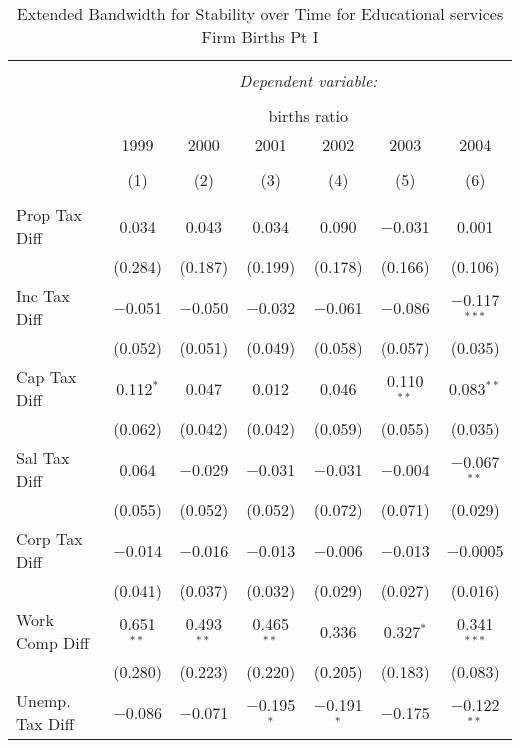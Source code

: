 
\begin{table}[!htbp] \centering 
  \caption{Extended Bandwidth for Stability over Time for  Educational services Firm Births Pt I} 
  \label{61year_eb} 
\small 
\begin{tabular}{@{\extracolsep{5pt}}lcccccc} 
\\[-1.8ex]\hline 
\hline \\[-1.8ex] 
 & \multicolumn{6}{c}{\textit{Dependent variable:}} \\ 
\cline{2-7} 
\\[-1.8ex] & \multicolumn{6}{c}{births ratio} \\ 
 & 1999 & 2000 & 2001 & 2002 & 2003 & 2004 \\ 
\\[-1.8ex] & (1) & (2) & (3) & (4) & (5) & (6)\\ 
\hline \\[-1.8ex] 
 Prop Tax Diff & 0.034 & 0.043 & 0.034 & 0.090 & $-$0.031 & 0.001 \\ 
  & (0.284) & (0.187) & (0.199) & (0.178) & (0.166) & (0.106) \\ 
  Inc Tax Diff & $-$0.051 & $-$0.050 & $-$0.032 & $-$0.061 & $-$0.086 & $-$0.117$^{***}$ \\ 
  & (0.052) & (0.051) & (0.049) & (0.058) & (0.057) & (0.035) \\ 
  Cap Tax Diff & 0.112$^{*}$ & 0.047 & 0.012 & 0.046 & 0.110$^{**}$ & 0.083$^{**}$ \\ 
  & (0.062) & (0.042) & (0.042) & (0.059) & (0.055) & (0.035) \\ 
  Sal Tax Diff & 0.064 & $-$0.029 & $-$0.031 & $-$0.031 & $-$0.004 & $-$0.067$^{**}$ \\ 
  & (0.055) & (0.052) & (0.052) & (0.072) & (0.071) & (0.029) \\ 
  Corp Tax Diff & $-$0.014 & $-$0.016 & $-$0.013 & $-$0.006 & $-$0.013 & $-$0.0005 \\ 
  & (0.041) & (0.037) & (0.032) & (0.029) & (0.027) & (0.016) \\ 
  Work Comp Diff & 0.651$^{**}$ & 0.493$^{**}$ & 0.465$^{**}$ & 0.336 & 0.327$^{*}$ & 0.341$^{***}$ \\ 
  & (0.280) & (0.223) & (0.220) & (0.205) & (0.183) & (0.083) \\ 
  Unemp. Tax Diff & $-$0.086 & $-$0.071 & $-$0.195$^{*}$ & $-$0.191$^{*}$ & $-$0.175 & $-$0.122$^{**}$ \\ 

\end{tabular}
\end{table}
